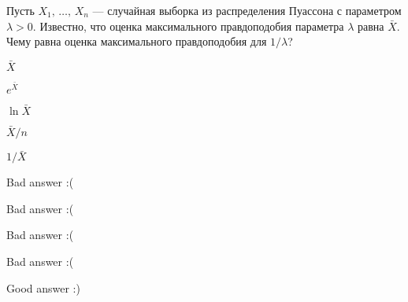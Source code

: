 
\begin{question}
Пусть \(X_1, \, \ldots, \, X_n\) --- случайная выборка из распределения
Пуассона с параметром \(\lambda > 0\). Известно, что оценка
максимального правдоподобия параметра \(\lambda\) равна \(\bar{X}\).
Чему равна оценка максимального правдоподобия для \(1 / \lambda\)?
\begin{answerlist}
  \item \(\bar{X}\)
  \item \(e^{\bar{X}}\)
  \item \(\ln \bar{X}\)
  \item \(\bar{X} / n\)
  \item \(1 / \bar{X}\)
\end{answerlist}
\end{question}

\begin{solution}
\begin{answerlist}
  \item Bad answer :(
  \item Bad answer :(
  \item Bad answer :(
  \item Bad answer :(
  \item Good answer :)
\end{answerlist}
\end{solution}

